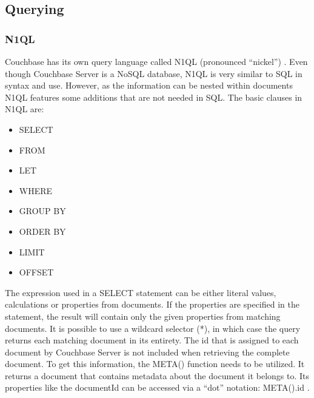 \subsection{Querying}
\subsubsection{N1QL} \label{couchbase:n1ql}
Couchbase has its own query language called N1QL (pronounced \enquote{nickel}) \parencite{couchbaseDocN1Ql}. Even though Couchbase Server is a NoSQL database, N1QL is very similar to SQL in syntax and use. However, as the information can be nested within documents N1QL features some additions that are not needed in SQL. The basic clauses in N1QL are: 
\begin{itemize}
    \item SELECT
    \item FROM
    \item LET
    \item WHERE
    \item GROUP BY
    \item ORDER BY
    \item LIMIT
    \item OFFSET
\end{itemize}
The expression used in a SELECT statement can be either literal values, calculations or properties from documents. If the properties are specified in the statement, the result will contain only the given properties from matching documents. It is possible to use a wildcard selector (*), in which case the query returns each matching document in its entirety. The id that is assigned to each document by Couchbase Server is not included when retrieving the complete document. To get this information, the META() function needs to be utilized. It returns a document that contains metadata about the document it belongs to. Its properties like the documentId can be accessed via a \enquote{dot} notation: META().id \parencite{proCouchbaseServer}.

